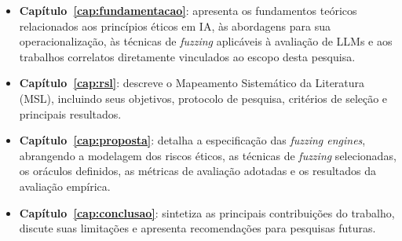 \begin{itemize}
    \item \textbf{Capítulo~\ref{cap:fundamentacao}}: apresenta os fundamentos teóricos relacionados aos princípios éticos em IA, às abordagens para sua operacionalização, às técnicas de \textit{fuzzing} aplicáveis à avaliação de LLMs e aos trabalhos correlatos diretamente vinculados ao escopo desta pesquisa.
    
    \item \textbf{Capítulo~\ref{cap:rsl}}: descreve o Mapeamento Sistemático da Literatura (MSL), incluindo seus objetivos, protocolo de pesquisa, critérios de seleção e principais resultados.
    
    \item \textbf{Capítulo~\ref{cap:proposta}}: detalha a especificação das \textit{fuzzing engines}, abrangendo a modelagem dos riscos éticos, as técnicas de \textit{fuzzing} selecionadas, os oráculos definidos, as métricas de avaliação adotadas e os resultados da avaliação empírica.

    \item \textbf{Capítulo~\ref{cap:conclusao}}: sintetiza as principais contribuições do trabalho, discute suas limitações e apresenta recomendações para pesquisas futuras.
\end{itemize}